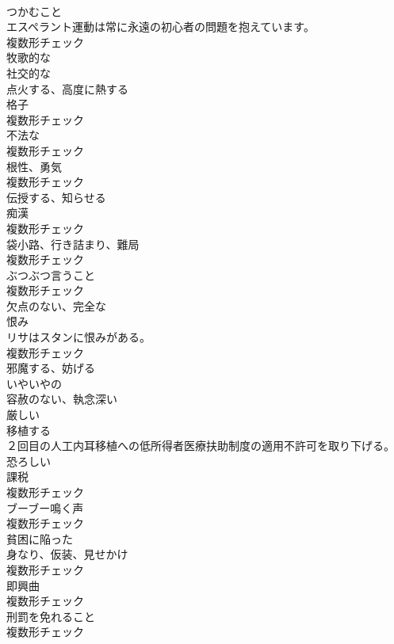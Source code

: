 \documentclass[8pt]{extreport}
\begin{document}
\begin{CJK}{UTF8}{min}
\\	[名詞]	つかむこと	
\\	エスペラント運動は常に永遠の初心者の問題を抱えています。	
\\	複数形チェック
\\	[形容詞]	牧歌的な	
\\	[形容詞]	社交的な	
\\	[動詞]	点火する、高度に熱する	
\\	[名詞]	格子	
\\	複数形チェック
\\	[名詞]	不法な	
\\	複数形チェック
\\	[名詞]	根性、勇気	
\\	複数形チェック
\\	[動詞]	伝授する、知らせる	
\\	[名詞]	痴漢	
\\	複数形チェック
\\	[名詞]	袋小路、行き詰まり、難局	
\\	複数形チェック
\\	[名詞]	ぶつぶつ言うこと	
\\	複数形チェック
\\	[形容詞]	欠点のない、完全な	
\\	[名詞]	恨み	
\\	リサはスタンに恨みがある。	
\\	複数形チェック
\\	[動詞]	邪魔する、妨げる	
\\	[形容詞]	いやいやの	
\\	[形容詞]	容赦のない、執念深い	
\\	[形容詞]	厳しい	
\\	[動詞]	移植する	
\\	２回目の人工内耳移植への低所得者医療扶助制度の適用不許可を取り下げる。	
\\	[形容詞]	恐ろしい	
\\	[名詞]	課税	
\\	複数形チェック
\\	[名詞]	ブーブー鳴く声	
\\	複数形チェック
\\	[形容詞]	貧困に陥った	
\\	[名詞]	身なり、仮装、見せかけ	
\\	複数形チェック
\\	[名詞]	即興曲	
\\	複数形チェック
\\	[名詞]	刑罰を免れること	
\\	複数形チェック

\end{CJK}
\end{document}
